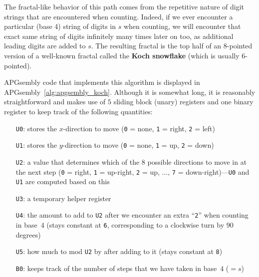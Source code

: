 The fractal-like behavior of this path comes from the repetitive nature of digit strings that are encountered when counting. Indeed, if we ever encounter a particular (base 4) string of digits in $s$ when counting, we will encounter that exact same string of digits infinitely many times later on too, as additional leading digits are added to $s$. The resulting fractal is the top half of an $8$-pointed version of a well-known fractal called the \textbf{Koch snowflake} (which is usually $6$-pointed).

APGsembly code that implements this algorithm is displayed in APGsembly~\ref{alg:apgsembly_koch}. Although it is somewhat long, it is reasonably straightforward and makes use of $5$ sliding block (unary) registers and one binary register to keep track of the following quantities:\smallskip

\begin{itemize}
	\item[\texttt{U0}:] stores the $x$-direction to move (\texttt{0} = none, \texttt{1} = right, \texttt{2} = left)
	
	\item[\texttt{U1}:] stores the $y$-direction to move (\texttt{0} = none, \texttt{1} = up, \texttt{2} = down)
	
	\item[\texttt{U2}:] a value that determines which of the 8 possible directions to move in at the next step (\texttt{0} = right, \texttt{1} = up-right, \texttt{2} = up, ..., \texttt{7} = down-right)---\texttt{U0} and \texttt{U1} are computed based on this
	
	\item[\texttt{U3}:] a temporary helper register
	
	\item[\texttt{U4}:] the amount to add to \texttt{U2} after we encounter an extra ``\texttt{2}'' when counting in base~$4$ (stays constant at \texttt{6}, corresponding to a clockwise turn by $90$ degrees)
	
	\item[\texttt{U5}:] how much to mod \texttt{U2} by after adding to it (stays constant at \texttt{8})\smallskip
	
	\item[\texttt{B0}:] keeps track of the number of steps that we have taken in base~$4$ ($= s$)\smallskip
\end{itemize}

